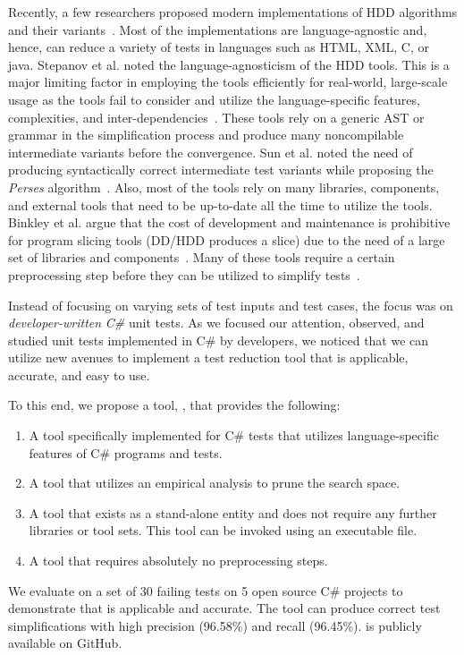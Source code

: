Recently, a few researchers proposed modern implementations of HDD algorithms and their variants~\cite{hodovan2016modernizing, perses, gopinath2020abstracting, stepanov2019reduktor}. Most of the implementations are language-agnostic and, hence, can reduce a variety of tests in languages such as HTML, XML, C, or java. Stepanov et al. noted the language-agnosticism of the HDD tools. This is a major limiting factor in employing the tools efficiently for real-world, large-scale usage as the tools fail to consider and utilize the language-specific features, complexities, and inter-dependencies~\cite{stepanov2019reduktor}. These tools rely on a generic AST or grammar in the simplification process and produce many noncompilable intermediate variants before the convergence. Sun et al. noted the need of producing syntactically correct intermediate test variants while proposing the \emph{Perses} algorithm~\cite{perses}. Also, most of the tools rely on many libraries, components, and external tools that need to be up-to-date all the time to utilize the tools. Binkley et al. argue that the cost of development and maintenance is prohibitive for program slicing tools (DD/HDD produces a slice) due to the need of a large set of libraries and components~\cite{binkley2014orbs}. Many of these tools require a certain preprocessing step before they can be utilized to simplify tests~\cite{perses, hodovan2016modernizing}. 

Instead of focusing on varying sets of test inputs and test cases, the focus was on \emph{developer-written} \emph{C\#} unit tests. As we focused our attention, observed, and studied unit tests implemented in C\# by developers, we noticed that we can utilize new avenues to implement a test reduction tool that is applicable, accurate, and easy to use. 

To this end, we propose a tool, \mytool, that provides the following: 

\begin{enumerate}
    \item A tool specifically implemented for C\# tests that utilizes language-specific features of C\# programs and tests. 
    \item A tool that utilizes an empirical analysis to prune the search space.
    \item A tool that exists as a stand-alone entity and does not require any further libraries or tool sets. This tool can be invoked using an executable file. 
    \item A tool that requires absolutely no preprocessing steps.
\end{enumerate}

We evaluate \mytool on a set of 30 failing tests on 5 open source C\# projects to demonstrate that \mytool is applicable and accurate. The tool can produce correct test simplifications with high precision (96.58\%) and recall (96.45\%). \mytool is publicly available on GitHub.










